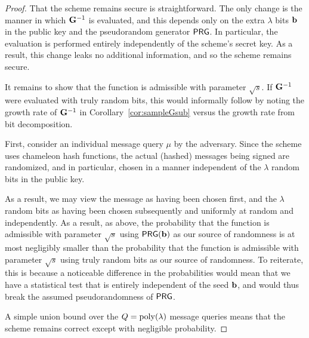 \begin{proof}
  That the scheme remains secure is straightforward. The only change is the
  manner in which
  $\mathbf{G}^{-1}$ is evaluated, and this depends only on the extra $\lambda$ bits
  $\mathbf{b}$ in the public key and the pseudorandom generator
  $\mathsf{PRG}$. In particular, the evaluation is performed entirely
  independently of the scheme's secret key. As a result, this change
  leaks no additional information, and so the scheme remains secure. 

It remains to show that the function is admissible with parameter
$\sqrt{s}$. If $\mathbf{G}^{-1}$ were evaluated with truly random bits,
this would informally follow by noting
the growth rate of $\mathbf{G}^{-1}$ in Corollary~\ref{cor:sampleGsub}
versus the growth rate from bit decomposition.

 First, consider an individual message query $\mu$ by the
  adversary. Since the scheme uses chameleon hash functions, the
  actual (hashed) messages being signed are randomized, and in
  particular, chosen in a manner independent of the $\lambda$ random
  bits in the public key.

  As a result, we may view the message as having been chosen first,
  and the $\lambda$ random bits as having been chosen subsequently and
  uniformly at random and independently. As a result, as above, the
  probability that the function is admissible with parameter $\sqrt{s}$
  using $\mathsf{PRG}(\mathbf{b})$ as our source of randomness is at most
  negligibly smaller than the probability that the function is
  admissible with parameter $\sqrt{s}$ using truly random bits as our source of
  randomness. To reiterate, this is because a noticeable difference in
  the probabilities would mean that we have a statistical test that is
  entirely independent of the seed $\mathbf{b}$, and would thus break the assumed
  pseudorandomness of $\mathsf{PRG}$. 

  A simple union bound over the $Q=\operatorname{poly}(\lambda)$ message
  queries means that the scheme remains correct except with negligible
  probability.
\end{proof}



